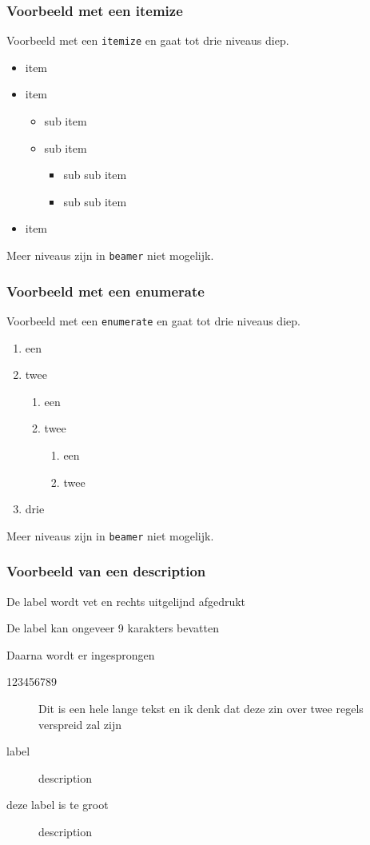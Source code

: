 \documentclass[fleqn,aspectratio=169,dutch,10pt]{beamer}
\begin{document}
\begin{frame}
\frametitle{Voorbeeld met een itemize}
Voorbeeld met een \texttt{itemize} en gaat tot drie niveaus diep.
\begin{itemize}
\item item
\item item
\begin{itemize}
\item sub item
\item sub item
\begin{itemize}
\item sub sub item
\item sub sub item
\end{itemize}
\end{itemize}
\item item
\end{itemize}
Meer niveaus zijn in \lstinline|beamer| niet mogelijk.
\end{frame}


\begin{frame}
\frametitle{Voorbeeld met een enumerate}
Voorbeeld met een \texttt{enumerate} en gaat tot drie niveaus diep.
\begin{enumerate}
\item een
\item twee
\begin{enumerate}
\item een
\item twee
\begin{enumerate}
\item een
\item twee
\end{enumerate}
\end{enumerate}
\item drie
\end{enumerate}
Meer niveaus zijn in \lstinline|beamer| niet mogelijk.
\end{frame}


\begin{frame}
\frametitle{Voorbeeld van een description}
De label wordt vet en rechts uitgelijnd afgedrukt

De label kan ongeveer 9 karakters bevatten

Daarna wordt er ingesprongen
\begin{description}
\item[123456789] Dit is een hele lange tekst en ik denk dat deze zin over twee regels verspreid zal zijn
\item[label] description
\item[deze label is te groot] description
\end{description}
\end{frame}
\end{document}
